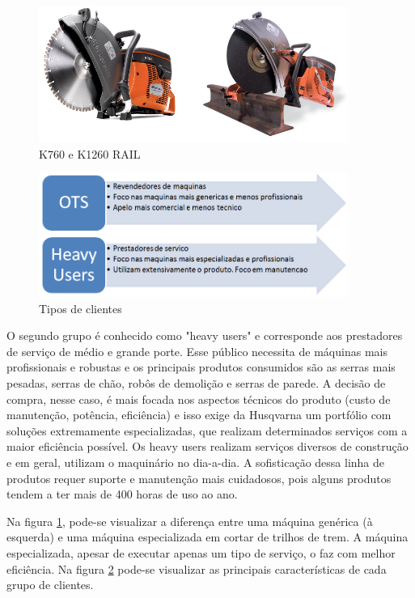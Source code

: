 \documentclass[12pt]{article}
\begin{document}
\begin{figure}[h!]
	\centering
	\includegraphics[width=0.9\textwidth]{img/k760-vs-k1260rail.png}
	\caption{K760 e K1260 RAIL}
	\label{fig:k700vsk1260}
\end{figure}

\begin{figure}[h!]
	\centering
	\includegraphics[width=0.9\textwidth]{img/clientes.png}
	\caption{Tipos de clientes}
	\label{fig:tipo-clientes}
\end{figure}

	O segundo grupo é conhecido como "heavy users" e corresponde aos prestadores de serviço de médio e grande porte. Esse público necessita de máquinas mais profissionais e robustas e os principais produtos consumidos são as serras mais pesadas, serras de chão, robôs de demolição e serras de parede. A decisão de compra, nesse caso, é mais focada nos aspectos técnicos do produto (custo de manutenção, potência, eficiência) e isso exige da Husqvarna um portfólio com soluções extremamente especializadas, que realizam determinados serviços com a maior eficiência possível. Os heavy users realizam serviços diversos de construção e em geral, utilizam o maquinário no dia-a-dia. A sofisticação dessa linha de produtos requer suporte e manutenção mais cuidadosos, pois alguns produtos tendem a ter mais de 400 horas de uso ao ano. 
	
	Na figura \ref{fig:k700vsk1260}, pode-se visualizar a diferença entre uma máquina genérica (à esquerda) e uma máquina especializada em cortar de trilhos de trem. A máquina especializada, apesar de executar apenas um tipo de serviço, o faz com melhor eficiência. Na figura \ref{fig:tipo-clientes} pode-se visualizar as principais características de cada grupo de clientes.
	
\end{document}
